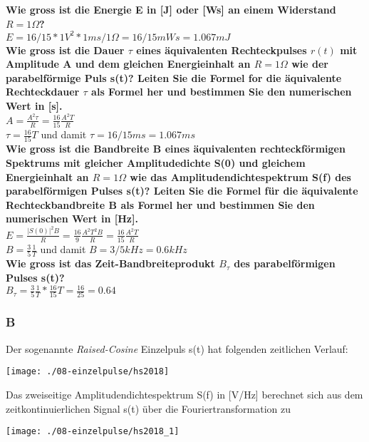 \textbf{Wie gross ist die Energie E in [J] oder [Ws] an einem Widerstand $R = 1 \Omega$?}\\
$E = 16/15 * 1 V^2 * 1ms / 1 \Omega = 16/15 mWs = 1.067 mJ$\\

\textbf{Wie gross ist die Dauer $\tau$ eines äquivalenten Rechteckpulses $r(t)$ mit Amplitude A und dem gleichen Energieinhalt an $R = 1 \Omega$ wie der parabelförmige Puls s(t)? Leiten Sie die Formel for die äquivalente Rechteckdauer $\tau $ als Formel her und bestimmen Sie den numerischen Wert in [s].}\\
$A=\frac{A^2\tau}{R}=\frac{16}{15}\frac{A^2T}{R}$\\
$\tau = \frac{16}{15}T$ und damit $\tau =16/15 ms = 1.067ms$\\

\textbf{Wie gross ist die Bandbreite B eines äquivalenten rechteckförmigen Spektrums mit gleicher Amplitudedichte S(0) und gleichem Energieinhalt an $R = 1 \Omega$ wie das Amplitudendichtespektrum S(f) des parabelförmigen Pulses s(t)? Leiten Sie die Formel für die äquivalente Rechteckbandbreite B als Formel her und bestimmen Sie den numerischen Wert in [Hz].}\\
$E=\frac{|S(0)|^2B}{R}=\frac{16}{9}\frac{A^2T^2B}{R}=\frac{16}{15}\frac{A^2T}{R}$\\
$B=\frac{3}{5}\frac{1}{T}$ und damit $B=3/5 kHz=0.6kHz$\\

\textbf{Wie gross ist das Zeit-Bandbreiteprodukt $B_{\tau }$ des parabelförmigen Pulses s(t)?}\\
$B_{\tau }=\frac{3}{5}\frac{1}{T}*\frac{16}{15}T=\frac{16}{25}=0.64$

\subsubsection{B}
Der sogenannte \textit{Raised-Cosine} Einzelpuls s(t) hat folgenden zeitlichen Verlauf:
\begin{center}
    \vspace{-8pt}
    \texttt{[image: ./08-einzelpulse/hs2018]}
    \vspace{-8pt}
\end{center}

Das zweiseitige Amplitudendichtespektrum S(f) in [V/Hz] berechnet sich aus dem zeitkontinuierlichen Signal s(t) über die Fouriertransformation zu
\begin{center}
    \vspace{-8pt}
    \texttt{[image: ./08-einzelpulse/hs2018\_1]}
    \vspace{-8pt}
\end{center}


